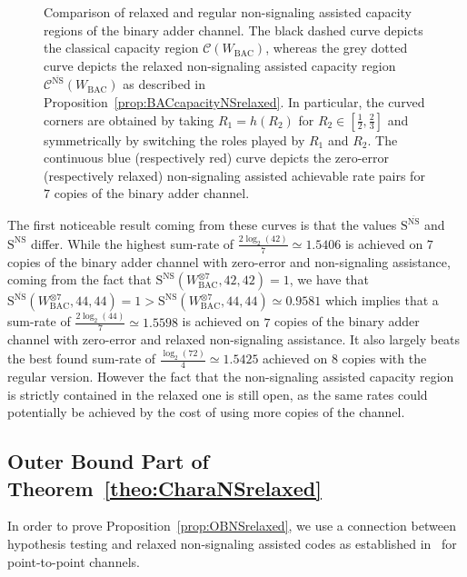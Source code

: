 \documentclass[11pt]{article}
\theoremstyle{definition}
\theoremstyle{remark}
\begin{document}
\begin{figure}[!h]
\begin{center}
      \caption{Comparison of relaxed and regular non-signaling assisted capacity regions of the binary adder channel. The black dashed curve depicts the classical capacity region $\mathcal{C}(W_{\text{BAC}})$, whereas the grey dotted curve depicts the relaxed non-signaling assisted capacity region $\mathcal{C}^{\overline{\mathrm{NS}}}(W_{\text{BAC}})$ as described in Proposition~\ref{prop:BACcapacityNSrelaxed}. In particular, the curved corners are obtained by taking $R_1=h(R_2)$ for $R_2 \in \left[\frac{1}{2},\frac{2}{3}\right]$ and symmetrically by switching the roles played by $R_1$ and $R_2$. The continuous blue (respectively red) curve depicts the zero-error (respectively relaxed) non-signaling assisted achievable rate pairs for $7$ copies of the binary adder channel.}
      \label{fig:BACNSrelaxed}
    \end{center}   
\end{figure}

The first noticeable result coming from these curves is that the values $\mathrm{S}^{\overline{\mathrm{NS}}}$ and $\mathrm{S}^{\mathrm{NS}}$ differ. While the highest sum-rate of $\frac{2\log_2(42)}{7} \simeq 1.5406$ is achieved on $7$ copies of the binary adder channel with zero-error and non-signaling assistance, coming from the fact that $\mathrm{S}^{\mathrm{NS}}(W^{\otimes 7}_{\mathrm{BAC}},42,42)=1$, we have that $\mathrm{S}^{\overline{\mathrm{NS}}}(W^{\otimes 7}_{\mathrm{BAC}},44,44)=1>\mathrm{S}^{\mathrm{NS}}(W^{\otimes 7}_{\mathrm{BAC}},44,44) \simeq 0.9581$ which implies that a sum-rate of $\frac{2\log_2(44)}{7} \simeq 1.5598$ is achieved on $7$ copies of the binary adder channel with zero-error and relaxed non-signaling assistance. It also largely beats the best found sum-rate of $\frac{\log_2(72)}{4} \simeq 1.5425$ achieved on $8$ copies with the regular version. However the fact that the non-signaling assisted capacity region is strictly contained in the relaxed one is still open, as the same rates could potentially be achieved by the cost of using more copies of the channel.
  
  \subsection{Outer Bound Part of Theorem~\ref{theo:CharaNSrelaxed}}
In order to prove Proposition~\ref{prop:OBNSrelaxed}, we use a connection between hypothesis testing and relaxed non-signaling assisted codes as established in~\cite{Matthews12} for point-to-point channels.
\end{document}
